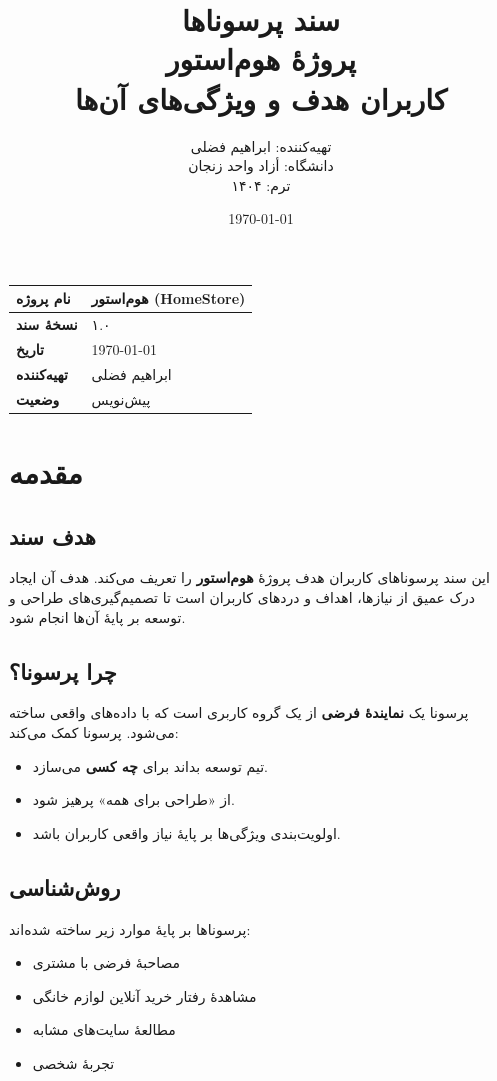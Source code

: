 \documentclass[12pt, a4paper]{article}
\title{
    \vspace{-1cm}
    \textbf{\Huge سند پرسوناها}\\[0.3cm]
    \textbf{\LARGE پروژهٔ هوم‌استور}\\[0.5cm]
    \large کاربران هدف و ویژگی‌های آن‌ها
}
\author{
    تهیه‌کننده: ابراهیم فضلی\\
    دانشگاه: أزاد واحد زنجان\\
    ترم: ۱۴۰۴
}
\date{\today}
\begin{document}
\maketitle
\thispagestyle{empty}

\vspace{1cm}

\begin{center}
\begin{tabular}{|l|l|}
\hline
\textbf{نام پروژه} & هوم‌استور (HomeStore) \\
\hline
\textbf{نسخهٔ سند} & ۱.۰ \\
\hline
\textbf{تاریخ} & \today \\
\hline
\textbf{تهیه‌کننده} & ابراهیم فضلی \\
\hline
\textbf{وضعیت} & پیش‌نویس \\
\hline
\end{tabular}
\end{center}

\newpage
\tableofcontents
\newpage

\section{مقدمه}

\subsection{هدف سند}
این سند پرسوناهای کاربران هدف پروژهٔ \textbf{هوم‌استور} را تعریف می‌کند.
هدف آن ایجاد درک عمیق از نیازها، اهداف و دردهای کاربران است تا
تصمیم‌گیری‌های طراحی و توسعه بر پایهٔ آن‌ها انجام شود.

\subsection{چرا پرسونا؟}
پرسونا یک \textbf{نمایندهٔ فرضی} از یک گروه کاربری است که با داده‌های واقعی
ساخته می‌شود. پرسونا کمک می‌کند:
\begin{itemize}
    \item تیم توسعه بداند برای \textbf{چه کسی} می‌سازد.
    \item از «طراحی برای همه» پرهیز شود.
    \item اولویت‌بندی ویژگی‌ها بر پایهٔ نیاز واقعی کاربران باشد.
\end{itemize}

\subsection{روش‌شناسی}
پرسوناها بر پایهٔ موارد زیر ساخته شده‌اند:
\begin{itemize}
    \item مصاحبهٔ فرضی با مشتری
    \item مشاهدهٔ رفتار خرید آنلاین لوازم خانگی
    \item مطالعهٔ سایت‌های مشابه
    \item تجربهٔ شخصی
\end{itemize}
\end{document}
